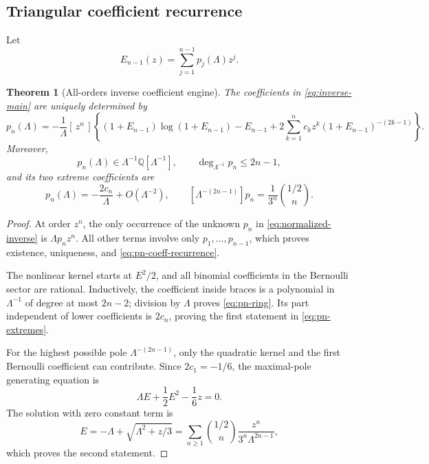 \documentclass[11pt,oneside]{article}
\theoremstyle{plain}
\newtheorem{theorem}{Theorem}[section]
\theoremstyle{definition}
\theoremstyle{remark}
\newcommand{\Q}{\mathbb Q}
\newcommand{\coeff}[2]{[\,#1^{#2}\,]}
\begin{document}
\subsection{Triangular coefficient recurrence}
\label{sec:inverse-recurrence}

Let
\begin{equation}
 E_{n-1}(z)=\sum_{j=1}^{n-1}p_j(\Lambda)z^j.
 \label{eq:Etrunc}
\end{equation}

\begin{theorem}[All-orders inverse coefficient engine]
\label{thm:inverse-recurrence}
The coefficients in \cref{eq:inverse-main} are uniquely determined by
\begin{equation}
 \boxed{
 p_n(\Lambda)=-\frac1\Lambda\coeff{z}{n}
 \left\{
 (1+E_{n-1})\log(1+E_{n-1})-E_{n-1}
 +2\sum_{k=1}^{n}c_kz^k(1+E_{n-1})^{-(2k-1)}
 \right\}.}
 \label{eq:pn-coeff-recurrence}
\end{equation}
Moreover,
\begin{equation}
 p_n(\Lambda)\in\Lambda^{-1}\Q[\Lambda^{-1}],
 \qquad
 \deg_{\Lambda^{-1}}p_n\le2n-1,
 \label{eq:pn-ring}
\end{equation}
and its two extreme coefficients are
\begin{equation}
 p_n(\Lambda)
 =-\frac{2c_n}{\Lambda}+O(\Lambda^{-2}),
 \qquad
 [\Lambda^{-(2n-1)}]p_n
 =\frac1{3^n}\binom{1/2}{n}.
 \label{eq:pn-extremes}
\end{equation}
\end{theorem}

\begin{proof}
At order \(z^n\), the only occurrence of the unknown \(p_n\) in
\cref{eq:normalized-inverse} is \(\Lambda p_nz^n\).  All other terms involve
only \(p_1,\ldots,p_{n-1}\), which proves existence, uniqueness, and
\cref{eq:pn-coeff-recurrence}.

The nonlinear kernel starts at \(E^2/2\), and all binomial coefficients in the
Bernoulli sector are rational.  Inductively, the coefficient inside braces is
a polynomial in \(\Lambda^{-1}\) of degree at most \(2n-2\); division by
\(\Lambda\) proves \cref{eq:pn-ring}.  Its part independent of lower
coefficients is \(2c_n\), proving the first statement in
\cref{eq:pn-extremes}.

For the highest possible pole \(\Lambda^{-(2n-1)}\), only the quadratic kernel
and the first Bernoulli coefficient can contribute.  Since \(2c_1=-1/6\), the
maximal-pole generating equation is
\[
 \Lambda E+\frac12E^2-\frac16z=0.
\]
The solution with zero constant term is
\[
 E=-\Lambda+\sqrt{\Lambda^2+z/3}
 =\sum_{n\ge1}\binom{1/2}{n}
   \frac{z^n}{3^n\Lambda^{2n-1}},
\]
which proves the second statement.
\end{proof}
\end{document}
